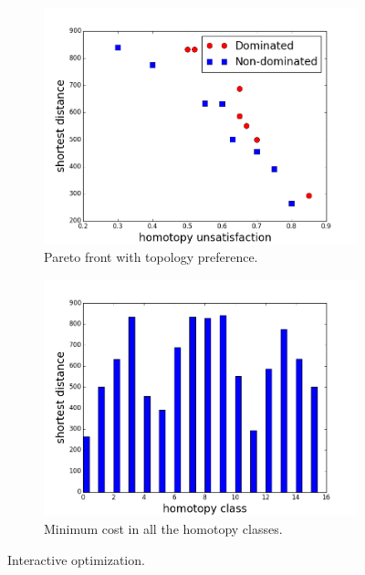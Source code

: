 \documentclass[letterpaper, 10 pt, conference]{ieeeconf}
\begin{document}
\begin{figure}
	\centering
	\begin{subfigure}[t]{0.47\linewidth}
		\centering
		\includegraphics[width=\textwidth]{fig/pareto_score.png}
		\caption{Pareto front with topology preference.}
		\label{fig:homotopy_human_interaction:pareto_score}
	\end{subfigure}  
	\begin{subfigure}[t]{0.47\linewidth}
		\centering
		\includegraphics[width=\textwidth]{fig/all_homotopy_score.png}
		\caption{Minimum cost in all the homotopy classes.}
		\label{fig:homotopy_human_interaction:all_scores}
	\end{subfigure}   
	\caption{Interactive optimization.}
	\label{fig:homotopy_human_interaction}
\end{figure}
\end{document}
